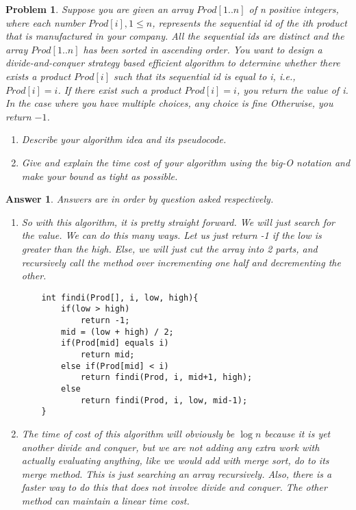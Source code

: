 \documentclass[11pt]{article}
\newtheorem{problem}{Problem}
\newtheorem{answer}{Answer}
\begin{document}
\bigskip

\begin{problem}
\label{prob:1}
 Suppose you are given an array $Prod[1..n]$ of n positive integers, where each number $Prod[i], 1 \leq n$, represents the sequential id of the ith product that is manufactured in your company. All the sequential ids are distinct and the array $Prod[1..n]$ has been sorted in ascending order. You want to design a divide-and-conquer strategy based efficient algorithm to determine whether there exists a product $Prod[i]$ such that its sequential id is equal to i, i.e., $Prod[i] = i$. If there exist such a product $Prod[i] = i$, you return the value of i. In the case where you have multiple choices, any choice is fine Otherwise, you return $-1$.
\begin{enumerate}
 \item Describe your algorithm idea and its pseudocode.
 \item Give and explain the time cost of your algorithm using the big-O notation and make your bound as tight as possible.
\end{enumerate}
\end{problem}

\begin{answer}
 \label{ans:2} Answers are in order by question asked respectively. 
 \begin{enumerate}
  \item So with this algorithm, it is pretty straight forward. We will just search for the value. We can do this many ways. Let us just return -1 if the low is greater than the high. Else, we will just cut the array into 2 parts, and recursively call the method over incrementing one half and decrementing the other.
\begin{lstlisting}
	int findi(Prod[], i, low, high){
		if(low > high)
			return -1;
		mid = (low + high) / 2;
		if(Prod[mid] equals i)
			return mid;
		else if(Prod[mid] < i)
			return findi(Prod, i, mid+1, high);
		else
			return findi(Prod, i, low, mid-1);
	}
\end{lstlisting}
 \item The time of cost of this algorithm will obviously be $\log{n}$ because it is yet another divide and conquer, but we are not adding any extra work with actually evaluating anything, like we would add with merge sort, do to its merge method. This is just searching an array recursively. Also, there is a faster way to do this that does not involve divide and conquer. The other method can maintain a linear time cost.
\end{enumerate}
\end{answer}
\end{document}

